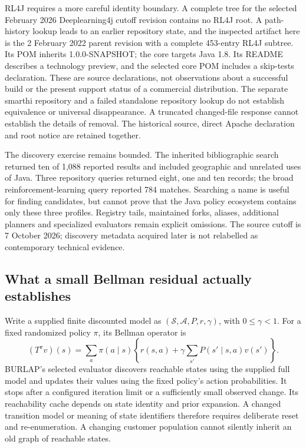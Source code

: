 RL4J requires a more careful identity boundary. A complete tree for the selected February 2026 Deeplearning4j cutoff revision contains no RL4J root. A path-history lookup leads to an earlier repository state, and the inspected artifact here is the 2 February 2022 parent revision with a complete 453-entry RL4J subtree. Its POM inherits 1.0.0-SNAPSHOT; the core targets Java 1.8. Its README describes a technology preview, and the selected core POM includes a skip-tests declaration. These are source declarations, not observations about a successful build or the present support status of a commercial distribution. The separate smarthi repository and a failed standalone repository lookup do not establish equivalence or universal disappearance. A truncated changed-file response cannot establish the details of removal. The historical source, direct Apache declaration and root notice are retained together.~\citep{exec24_policyjava_rl4j,exec24_policyjava_comparison}

The discovery exercise remains bounded. The inherited bibliographic search returned ten of 1,088 reported results and included geographic and unrelated uses of Java. Three repository queries returned eight, one and ten records; the broad reinforcement-learning query reported 784 matches. Searching a name is useful for finding candidates, but cannot prove that the Java policy ecosystem contains only these three profiles. Registry tails, maintained forks, aliases, additional planners and specialized evaluators remain explicit omissions. The source cutoff is 7 October 2026; discovery metadata acquired later is not relabelled as contemporary technical evidence.~\citep{exec24_policyjava_comparison}

\subsection{What a small Bellman residual actually establishes}
Write a supplied finite discounted model as $(\mathcal S,\mathcal A,P,r,\gamma)$, with $0\leq\gamma<1$. For a fixed randomized policy $\pi$, its Bellman operator is
\[
 (T^\pi v)(s)=\sum_a\pi(a\mid s)\left\{r(s,a)+\gamma\sum_{s'}P(s'\mid s,a)v(s')\right\}.
\]
BURLAP's selected evaluator discovers reachable states using the supplied full model and updates their values using the fixed policy's action probabilities. It stops after a configured iteration limit or a sufficiently small observed change. Its reachability cache depends on state identity and prior expansion. A changed transition model or meaning of state identifiers therefore requires deliberate reset and re-enumeration. A changing customer population cannot silently inherit an old graph of reachable states.~\citep{exec24_policyjava_burlap}

